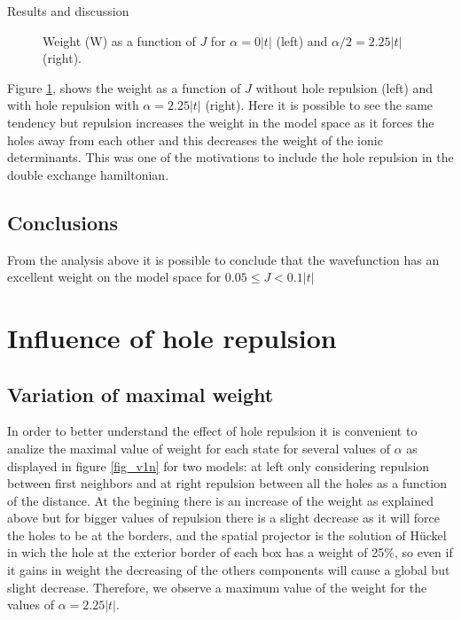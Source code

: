 \documentclass[12pt,twoside]{report}
\begin{document}
\begin{chapter}{Results and discussion}
\begin{figure}[h!]
\begin{minipage}{0.4\textwidth}
		\end{minipage}
		\caption{\label{fig_0_225} Weight (W) as a function of $J$ for $\alpha = 0 |t|$ (left) and $\alpha \slash 2 = 2.25|t|$ (right). }
	\end{figure}
	
	Figure \ref{fig_0_225}, shows the weight as a function of $J$ without hole
	repulsion (left) and with hole repulsion with $\alpha=2.25|t|$ (right). Here it
	is possible to see the same tendency but repulsion increases the weight in
	the model space as it forces the holes away from each other and this
	decreases the weight of the ionic determinants. This was one of the
	motivations to include the hole repulsion in the double exchange hamiltonian.

	\subsection{Conclusions}

	From the analysis above it is possible to conclude that the wavefunction has
	an excellent weight on the model space for $0.05 \leq J < 0.1|t|$

	\section{Influence of hole repulsion}

	\subsection{Variation of maximal weight}

	In order to better understand the effect of hole repulsion it is convenient
	to analize the maximal value of weight for each state for several values of
	$\alpha$ as displayed in figure \ref{fig_v1n} for two models: at left only
	considering repulsion between first neighbors and at right repulsion between
	all the holes as a function of the distance. At the begining there is an
	increase of the weight as explained above but for bigger values of repulsion
	there is a slight decrease as it will force the holes to be at the borders,
	and the spatial projector is the solution of Hückel in wich the hole at the
	exterior border of each box has a weight of 25$\%$, so even if it gains in
	weight the decreasing of the others components will cause a global but
	slight decrease. Therefore, we observe a maximum value of the weight for the
	values of $\alpha=2.25|t|$.
	

\end{chapter}
\end{document}
